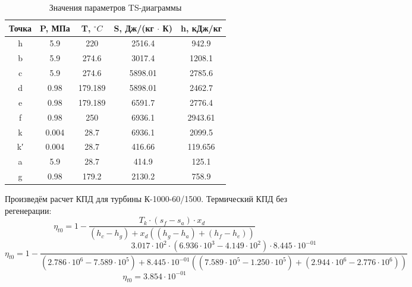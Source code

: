 \begin{table}[H]
	\caption{Значения параметров TS-диаграммы}
	\begin{center}
        \begin{tabular}{|c|c|c|c|c|}
        \toprule
         Точка & P, МПа & T, $^\circ C$ & S, Дж/(кг $\cdot$ К) & h, кДж/кг \\ 
         \midrule
         \hline
          h & 5.9 & 220 & 2516.4 & 942.9\\ 
         \hline
          b & 5.9 & 274.6 & 3017.4 & 1208.1 \\ 
         \hline
          c & 5.9 & 274.6 & 5898.01 & 2785.6\\ 
         \hline
          d & 0.98 & 179.189 & 5898.01 & 2462.7 \\ 
         \hline
          e & 0.98 & 179.189 & 6591.7 & 2776.4 \\ 
         \hline
          f & 0.98 & 250  & 6936.1 & 2943.61 \\ 
         \hline
          k & 0.004 & 28.7 & 6936.1 & 2099.5 \\ 
         \hline
          k′ & 0.004 & 28.7 & 416.66 & 119.656 \\ 
         \hline
          a & 5.9  & 28.7 & 414.9 & 125.1 \\ 
         \hline
          g & 0.98 & 179.2 & 2130.2 & 758.9 \\ 
         \bottomrule
		\end{tabular}
		\label{tabular:coeffs}
	\end{center}
\end{table}

Произведём расчет КПД для турбины К-1000-60/1500. Термический КПД без регенерации:
\begin{equation}
\eta_{t0}=1 - 
\frac{T_{k} ⋅ \left( s_{f} - s_{a} \right) ⋅ x_{d}}
{\left( h_{c} - h_{g} \right) +x_{d}\left( \left( h_{g} - h_{a} \right) + \left( h_{f} - h_{e} \right) \right)}
\end{equation}
\begin{equation}
\eta_{t0} = 
1 - 
\frac{3.017 \cdot 10^{ 2 } ⋅ \left( 6.936 \cdot 10^{ 3 } - 4.149 \cdot 10^{ 2 } \right) ⋅ 8.445 \cdot 10^{ -01 }}
{\left( 2.786 \cdot 10^{ 6 } - 7.589 \cdot 10^{ 5 } \right) + 8.445 \cdot 10^{ -01 } \left( \left( 7.589 \cdot 10^{ 5 } - 1.250 \cdot 10^{ 5 } \right) + \left( 2.944 \cdot 10^{ 6 } - 2.776 \cdot 10^{ 6 } \right) \right)}
\end{equation}
\begin{equation}
\eta_{t0}=3.854 \cdot 10^{ -01 }
\end{equation}

